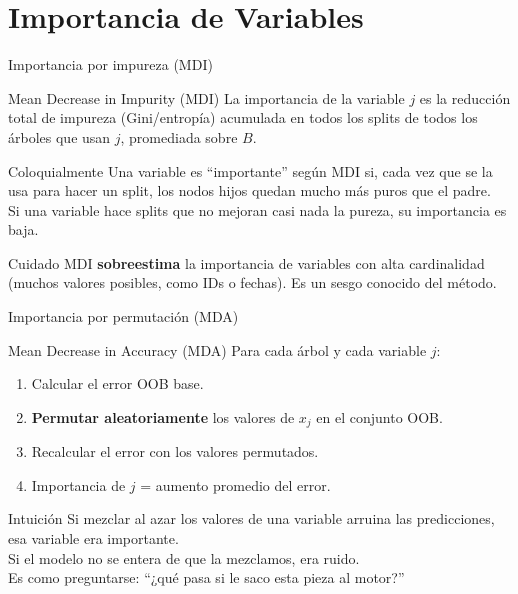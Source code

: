 \documentclass[aspectratio=169]{beamer}
\begin{document}
\section{Importancia de Variables}

\begin{frame}{Importancia por impureza (MDI)}
  \begin{block}{Mean Decrease in Impurity (MDI)}
    La importancia de la variable $j$ es la reducción total de impureza (Gini/entropía)
    acumulada en todos los splits de todos los árboles que usan $j$, promediada sobre $B$.
  \end{block}

  \medskip
  \begin{exampleblock}{Coloquialmente}
    Una variable es ``importante'' según MDI si, cada vez que se la usa para hacer un split,
    los nodos hijos quedan mucho más puros que el padre.\\
    Si una variable hace splits que no mejoran casi nada la pureza, su importancia es baja.
  \end{exampleblock}

  \medskip
  \begin{alertblock}{Cuidado}
    MDI \textbf{sobreestima} la importancia de variables con alta cardinalidad
    (muchos valores posibles, como IDs o fechas).
    Es un sesgo conocido del método.
  \end{alertblock}
\end{frame}

\begin{frame}{Importancia por permutación (MDA)}
  \begin{block}{Mean Decrease in Accuracy (MDA)}
    Para cada árbol y cada variable $j$:
    \begin{enumerate}
      \item Calcular el error OOB base.
      \item \textbf{Permutar aleatoriamente} los valores de $x_j$ en el conjunto OOB.
      \item Recalcular el error con los valores permutados.
      \item Importancia de $j$ = aumento promedio del error.
    \end{enumerate}
  \end{block}

  \medskip
  \begin{exampleblock}{Intuición}
    Si mezclar al azar los valores de una variable arruina las predicciones,
    esa variable era importante.\\
    Si el modelo no se entera de que la mezclamos, era ruido.\\[4pt]
    Es como preguntarse: ``¿qué pasa si le saco esta pieza al motor?''
  \end{exampleblock}
\end{frame}
\end{document}

